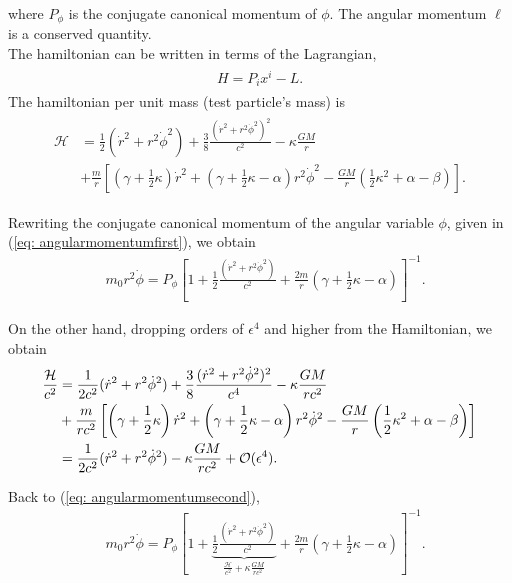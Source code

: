 where $P_\phi$ is the conjugate canonical momentum of $\phi$. The angular momentum $\ell$ is a conserved quantity.\\


The hamiltonian can be written in terms of the Lagrangian,
\begin{align*}
\begin{gathered}
H = P_i x^i-L.
\end{gathered}
\end{align*}
The hamiltonian per unit mass (test particle's mass) is
\begin{align}
\label{eq:firsthamiltonian}
\begin{split}
\mathcal{H} &= \frac{1}{2} (\dot{r}^2+r^2\dot{\phi}^2)+\frac{3}{8}\frac{(\dot{r}^2+r^2\dot{\phi}^2)^2}{c^2}-\kappa\frac{GM}{r} \\
&+\frac{m}{r}\left[\left(\gamma+\frac{1}{2}\kappa\right)\dot{r}^2+\left(\gamma+\frac{1}{2}\kappa - \alpha\right)r^2\dot{\phi}^2-\frac{GM}{r}\left(\frac{1}{2}\kappa^2+\alpha-\beta\right)\right].
\end{split}
\end{align}

Rewriting the conjugate canonical momentum of the angular variable $\phi$, given in (\ref{eq: angularmomentumfirst}), we obtain 
\begin{align}
\label{eq: angularmomentumsecond}
&m_0r^2\dot{\phi} = P_\phi\left[1+\frac{1}{2}\frac{(\dot{r}^2+r^2\dot{\phi}^2)}{c^2}+\frac{2m}{r}\left(\gamma+\frac{1}{2}\kappa-\alpha\right)\right]^{-1}.
\end{align}

On the other hand, dropping orders of $\epsilon^4$ and higher from the Hamiltonian, we obtain
\begin{align}
\notag
\frac{\mathcal{H}}{c^2} &= \frac{1}{2c^2} (\dot{r}^2+r^2\dot{\phi}^2)+\frac{3}{8}\frac{(\dot{r}^2+r^2\dot{\phi}^2)^2}{c^4}-\kappa\frac{GM}{rc^2}\\ \notag
&+\frac{m}{rc^2}\left[\left(\gamma+\frac{1}{2}\kappa\right)\dot{r}^2+\left(\gamma+\frac{1}{2}\kappa - \alpha\right)r^2\dot{\phi}^2-\frac{GM}{r}\left(\frac{1}{2}\kappa^2+\alpha-\beta\right)\right]\\
\label{eq: newtonhamiltonian}
&=\frac{1}{2c^2}(\dot{r}^2+r^2\dot{\phi}^2)-\kappa\frac{GM}{rc^2}+\mathcal{O}(\epsilon^4).
\end{align}

Back to (\ref{eq: angularmomentumsecond}),
\begin{align*}
&m_0r^2\dot{\phi} = P_\phi\left[1+\underbrace{\frac{1}{2}\frac{(\dot{r}^2+r^2\dot{\phi}^2)}{c^2}}_{\frac{\mathcal{H}}{c^2} +\kappa\frac{GM}{rc^2} }+\frac{2m}{r}\left(\gamma+\frac{1}{2}\kappa-\alpha\right)\right]^{-1}.
\end{align*}

